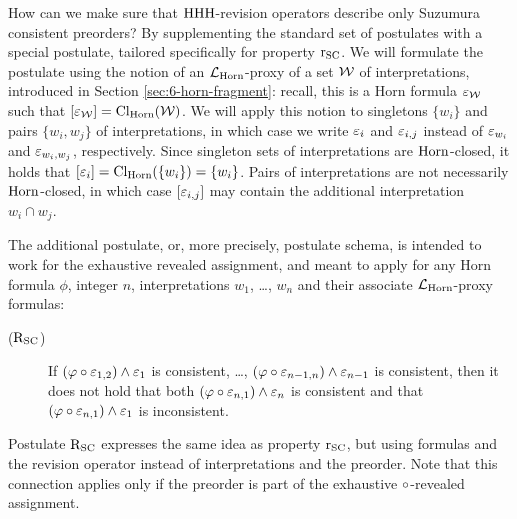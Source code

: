 How can we make sure that ${\mathrm{HHH}}$-revision operators 
describe only Suzumura consistent preorders? 
By supplementing the standard set of postulates
with a special postulate, tailored specifically for property $\mathrm{r}_{{\mathrm{SC}}}$.
We will formulate the postulate using 
the notion of an $\mathcal{L}_{\mathrm{Horn}}$-proxy
of a set $\mathcal{W}$ of interpretations, 
introduced in Section \ref{sec:6-horn-fragment}: 
recall, this is a Horn formula $\varepsilon_{\mathcal{W}}$
such that $[\varepsilon_{\mathcal{W}}]={\operatorname{Cl}}_{\mathrm{Horn}}(\mathcal{W})$.
We will apply this notion to singletons $\{w_i\}$ 
and pairs $\{w_i,w_j\}$ of interpretations,
in which case we write $\varepsilon_{i}$ and $\varepsilon_{i,j}$
instead of $\varepsilon_{w_i}$ and $\varepsilon_{w_i,w_j}$, respectively.
Since singleton sets of interpretations are $\mathrm{Horn}$-closed,
it holds that $[\varepsilon_{i}]={\operatorname{Cl}}_{\mathrm{Horn}}(\{w_i\})=\{w_i\}$.
Pairs of interpretations are not necessarily $\mathrm{Horn}$-closed,
in which case $[\varepsilon_{i,j}]$ may contain
the additional interpretation $w_i\cap w_j$.

The additional postulate, or, more precisely, 
postulate schema, is intended 
to work for the exhaustive revealed assignment,
and meant to apply for any Horn formula $\phi$, integer $n$,
interpretations $w_1$, \dots, $w_n$
and their associate $\mathcal{L}_{\mathrm{Horn}}$-proxy formulas:

\begin{description}
	\item[($\mathrm{R}_{{\mathrm{SC}}}$)]
		If 
			$(\varphi\circ\varepsilon_{1,2})\land\varepsilon_{1}$ is consistent,
			\dots,
			$(\varphi\circ\varepsilon_{n-1,n})\land\varepsilon_{n-1}$ is consistent,
		then it does not hold that both
		$(\varphi\circ\varepsilon_{n,1})\land\varepsilon_{n}$ is consistent
		and that $(\varphi\circ\varepsilon_{n,1})\land\varepsilon_{1}$ is inconsistent.
\end{description}

Postulate $\mathrm{R}_{{\mathrm{SC}}}$ expresses the same idea as property $\mathrm{r}_{{\mathrm{SC}}}$,
but using formulas and the revision operator 
instead of interpretations and the preorder.
Note that this connection applies only if the preorder
is part of the exhaustive $\circ$-revealed assignment.

